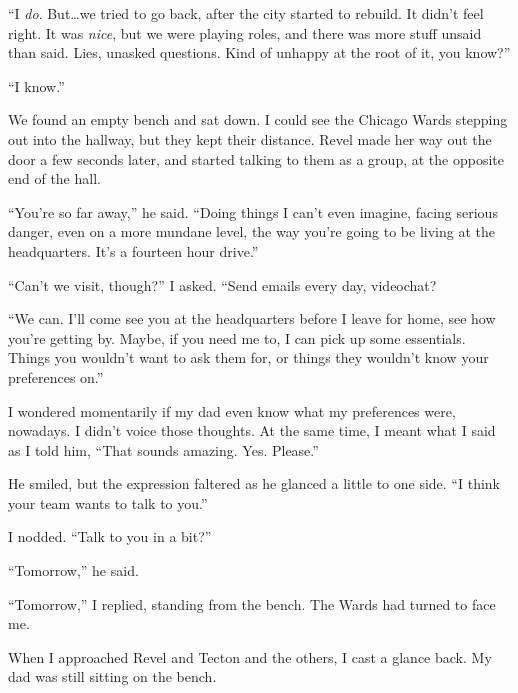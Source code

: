 ``I \emph{do}.  But\ldots we tried to go back, after the city started to rebuild.  It didn't feel right.  It was \emph{nice}, but we were playing roles, and there was more stuff unsaid than said.  Lies, unasked questions.  Kind of unhappy at the root of it, you know?''



``I know.''



We found an empty bench and sat down.  I could see the Chicago Wards stepping out into the hallway, but they kept their distance.  Revel made her way out the door a few seconds later, and started talking to them as a group, at the opposite end of the hall.



``You're so far away,'' he said.  ``Doing things I can't even imagine, facing serious danger, even on a more mundane level, the way you're going to be living at the headquarters.  It's a fourteen hour drive.''



``Can't we visit, though?''  I asked.  ``Send emails every day, videochat?



``We can.  I'll come see you at the headquarters before I leave for home, see how you're getting by.  Maybe, if you need me to, I can pick up some essentials.  Things you wouldn't want to ask them for, or things they wouldn't know your preferences on.''



I wondered momentarily if my dad even know what my preferences were, nowadays.  I didn't voice those thoughts.  At the same time, I meant what I said as I told him, ``That sounds amazing.  Yes. Please.''



He smiled, but the expression faltered as he glanced a little to one side.  ``I think your team wants to talk to you.''



I nodded.  ``Talk to you in a bit?''



``Tomorrow,'' he said.



``Tomorrow,'' I replied, standing from the bench.  The Wards had turned to face me.



When I approached Revel and Tecton and the others, I cast a glance back.  My dad was still sitting on the bench.



